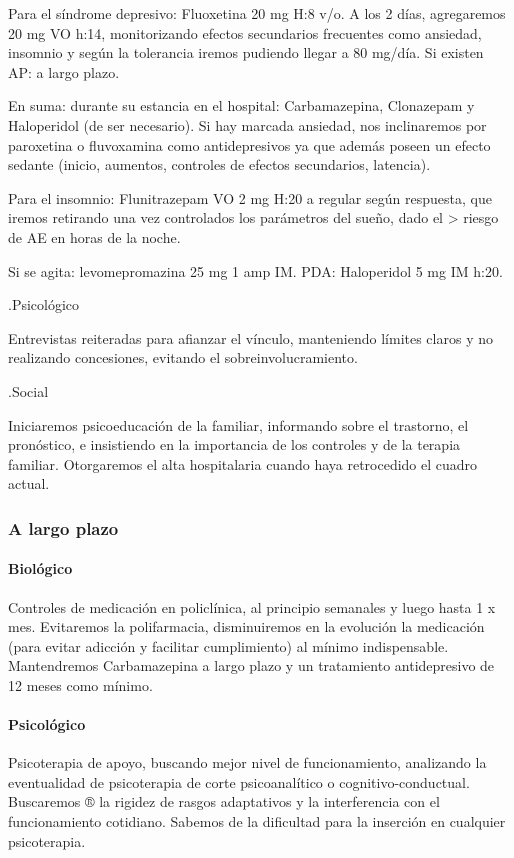 Para el síndrome depresivo: Fluoxetina 20 mg H:8 v/o. A los 2 días, agregaremos 20 mg VO h:14, monitorizando efectos secundarios frecuentes como ansiedad, insomnio y según la tolerancia iremos pudiendo llegar a 80 mg/día. Si existen AP: a largo plazo.

En suma: durante su estancia en el hospital: Carbamazepina, Clonazepam y Haloperidol (de ser necesario). Si hay marcada ansiedad, nos inclinaremos por paroxetina o fluvoxamina como antidepresivos ya que además poseen un efecto sedante (inicio, aumentos, controles de efectos secundarios, latencia).

Para el insomnio: Flunitrazepam VO 2 mg H:20 a regular según respuesta, que iremos retirando una vez controlados los parámetros del sueño, dado el > riesgo de AE en horas de la noche.

Si se agita: levomepromazina 25 mg 1 amp IM. PDA: Haloperidol 5 mg IM h:20.

.Psicológico

Entrevistas reiteradas para afianzar el vínculo, manteniendo límites claros y no realizando concesiones, evitando el sobreinvolucramiento.

.Social

Iniciaremos psicoeducación de la familiar, informando sobre el trastorno, el pronóstico, e insistiendo en la importancia de los controles y de la terapia familiar. Otorgaremos el alta hospitalaria cuando haya retrocedido el cuadro actual.
\subsubsection*{A largo plazo}
\paragraph{Biológico}
Controles de medicación en policlínica, al principio semanales y luego hasta 1 x mes. Evitaremos la polifarmacia, disminuiremos en la evolución la medicación (para evitar adicción y facilitar cumplimiento) al mínimo indispensable. Mantendremos Carbamazepina a largo plazo y un tratamiento antidepresivo de 12 meses como mínimo.
\paragraph{Psicológico}
Psicoterapia de apoyo, buscando mejor nivel de funcionamiento, analizando la eventualidad de psicoterapia de corte psicoanalítico o cognitivo-conductual. Buscaremos ® la rigidez de rasgos adaptativos y la interferencia con el funcionamiento cotidiano. Sabemos de la dificultad para la inserción en cualquier psicoterapia.
